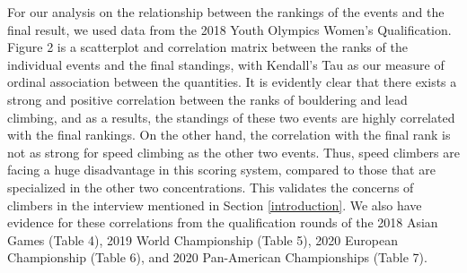 \documentclass[12pt]{article}
\begin{document}
For our analysis on the relationship between the rankings of the events
and the final result, we used data from the 2018 Youth Olympics Women's
Qualification. Figure 2 is a scatterplot and correlation matrix between
the ranks of the individual events and the final standings, with
Kendall's Tau \citep{kendall1938} as our measure of ordinal association
between the quantities. It is evidently clear that there exists a strong
and positive correlation between the ranks of bouldering and lead
climbing, and as a results, the standings of these two events are highly
correlated with the final rankings. On the other hand, the correlation
with the final rank is not as strong for speed climbing as the other two
events. Thus, speed climbers are facing a huge disadvantage in this
scoring system, compared to those that are specialized in the other two
concentrations. This validates the concerns of climbers in the interview
mentioned in Section \ref{introduction}. We also have evidence for these
correlations from the qualification rounds of the 2018 Asian Games
(Table 4), 2019 World Championship (Table 5), 2020 European Championship
(Table 6), and 2020 Pan-American Championships (Table 7).
\end{document}
